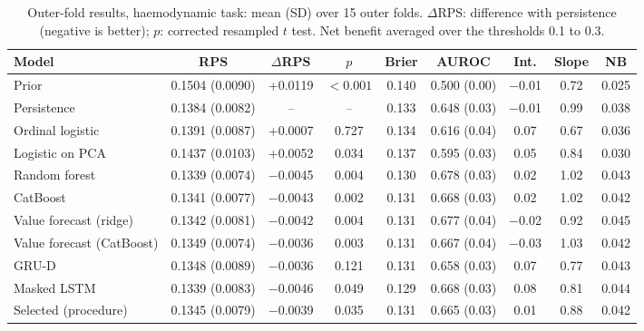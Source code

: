 \begin{table}[htbp]
\centering\footnotesize\setlength{\tabcolsep}{4pt}
\caption{Outer-fold results, haemodynamic task: mean (SD) over 15 outer folds. $\Delta$RPS: difference with persistence (negative is better); $p$: corrected resampled $t$ test. Net benefit averaged over the thresholds 0.1 to 0.3.}\label{tab:bench-haemodynamic}
\begin{tabular}{@{}lcccccccc@{}}
\toprule
\textbf{Model} & \textbf{RPS} & \textbf{$\Delta$RPS} & \textbf{$p$} & \textbf{Brier} & \textbf{AUROC} & \textbf{Int.} & \textbf{Slope} & \textbf{NB} \\
\midrule
Prior & 0.1504 (0.0090) & +0.0119 & $<0.001$ & 0.140 & 0.500 (0.00) & $-$0.01 & 0.72 & 0.025 \\
Persistence & 0.1384 (0.0082) & -- & -- & 0.133 & 0.648 (0.03) & $-$0.01 & 0.99 & 0.038 \\
\addlinespace
Ordinal logistic & 0.1391 (0.0087) & +0.0007 & 0.727 & 0.134 & 0.616 (0.04) & 0.07 & 0.67 & 0.036 \\
Logistic on PCA & 0.1437 (0.0103) & +0.0052 & 0.034 & 0.137 & 0.595 (0.03) & 0.05 & 0.84 & 0.030 \\
Random forest & 0.1339 (0.0074) & $-$0.0045 & 0.004 & 0.130 & 0.678 (0.03) & 0.02 & 1.02 & 0.043 \\
CatBoost & 0.1341 (0.0077) & $-$0.0043 & 0.002 & 0.131 & 0.668 (0.03) & 0.02 & 1.02 & 0.042 \\
Value forecast (ridge) & 0.1342 (0.0081) & $-$0.0042 & 0.004 & 0.131 & 0.677 (0.04) & $-$0.02 & 0.92 & 0.045 \\
Value forecast (CatBoost) & 0.1349 (0.0074) & $-$0.0036 & 0.003 & 0.131 & 0.667 (0.04) & $-$0.03 & 1.03 & 0.042 \\
GRU-D & 0.1348 (0.0089) & $-$0.0036 & 0.121 & 0.131 & 0.658 (0.03) & 0.07 & 0.77 & 0.043 \\
Masked LSTM & 0.1339 (0.0083) & $-$0.0046 & 0.049 & 0.129 & 0.668 (0.03) & 0.08 & 0.81 & 0.044 \\
Selected (procedure) & 0.1345 (0.0079) & $-$0.0039 & 0.035 & 0.131 & 0.665 (0.03) & 0.01 & 0.88 & 0.042 \\
\bottomrule
\end{tabular}
\end{table}
